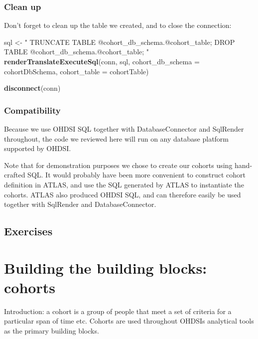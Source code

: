 \documentclass[11pt]{book}
\newenvironment{Shaded}{\begin{snugshade}}{\end{snugshade}}
\newcommand{\KeywordTok}[1]{\textcolor[rgb]{0.13,0.29,0.53}{\textbf{#1}}}
\newcommand{\DataTypeTok}[1]{\textcolor[rgb]{0.13,0.29,0.53}{#1}}
\newcommand{\StringTok}[1]{\textcolor[rgb]{0.31,0.60,0.02}{#1}}
\newcommand{\NormalTok}[1]{#1}
\begin{document}
\subsection{Clean up}\label{clean-up}

Don't forget to clean up the table we created, and to close the
connection:

\begin{Shaded}
\begin{Highlighting}[]
\NormalTok{sql <-}\StringTok{ "}
\StringTok{TRUNCATE TABLE @cohort_db_schema.@cohort_table;}
\StringTok{DROP TABLE @cohort_db_schema.@cohort_table;}
\StringTok{"}
\KeywordTok{renderTranslateExecuteSql}\NormalTok{(conn, sql,}
                          \DataTypeTok{cohort_db_schema =}\NormalTok{ cohortDbSchema,}
                          \DataTypeTok{cohort_table =}\NormalTok{ cohortTable)}

\KeywordTok{disconnect}\NormalTok{(conn)}
\end{Highlighting}
\end{Shaded}

\subsection{Compatibility}\label{compatibility}

Because we use OHDSI SQL together with DatabaseConnector and SqlRender
throughout, the code we reviewed here will run on any database platform
supported by OHDSI.

Note that for demonstration purposes we chose to create our cohorts
using hand-crafted SQL. It would probably have been more convenient to
construct cohort definition in ATLAS, and use the SQL generated by ATLAS
to instantiate the cohorts. ATLAS also produced OHDSI SQL, and can
therefore easily be used together with SqlRender and DatabaseConnector.

\section{Exercises}\label{exercises}

\chapter{Building the building blocks: cohorts}\label{Cohorts}

Introduction: a cohort is a group of people that meet a set of criteria
for a particular span of time etc. Cohorts are used throughout OHDSIs
analytical tools as the primary building blocks.
\end{document}
